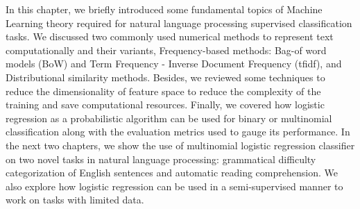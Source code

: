 In this chapter, we briefly introduced some fundamental topics of Machine Learning theory required for natural language processing supervised classification tasks. We discussed two commonly used numerical methods to represent text computationally and their variants, Frequency-based methods: Bag-of word models (BoW) and Term Frequency - Inverse Document Frequency (tfidf), and Distributional similarity methods. Besides, we reviewed some techniques to reduce the dimensionality of feature space to reduce the complexity of the training and save computational resources. Finally, we covered how logistic regression as a probabilistic algorithm can be used for binary or multinomial classification along with the evaluation metrics used to gauge its performance. In the next two chapters, we show the use of multinomial logistic regression classifier on two novel tasks in natural language processing: grammatical difficulty categorization of English sentences and automatic reading comprehension. We also explore how logistic regression can be used in a semi-supervised manner to work on tasks with limited data. 